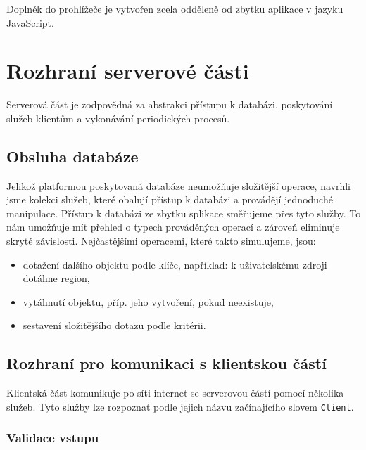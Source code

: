 Doplněk do prohlížeče je vytvořen zcela odděleně od zbytku aplikace v jazyku JavaScript.

\section{Rozhraní serverové části}

Serverová část je zodpovědná za abstrakci přístupu k databázi, poskytování služeb klientům a vykonávání periodických procesů.

\subsection{Obsluha databáze}
Jelikož platformou poskytovaná databáze neumožňuje složitější operace, navrhli jsme kolekci služeb, které obalují přístup k databázi a provádějí jednoduché manipulace.
Přístup k databázi ze zbytku splikace směřujeme přes tyto služby.
To nám umožňuje mít přehled o typech prováděných operací a zároveň eliminuje skryté závislosti.
Nejčastějšími operacemi, které takto simulujeme, jsou:
\begin{itemize}
	\item dotažení dalšího objektu podle klíče, například: k uživatelskému zdroji dotáhne region,
	\item vytáhnutí objektu, příp. jeho vytvoření, pokud neexistuje,
	\item sestavení složitějšího dotazu podle kritérii.
\end{itemize}

\subsection{Rozhraní pro komunikaci s klientskou částí}

Klientská část komunikuje po síti internet se serverovou částí pomocí několika služeb.
Tyto služby lze rozpoznat podle jejich názvu začínajícího slovem \verb|Client|.

\subsubsection{Validace vstupu}

